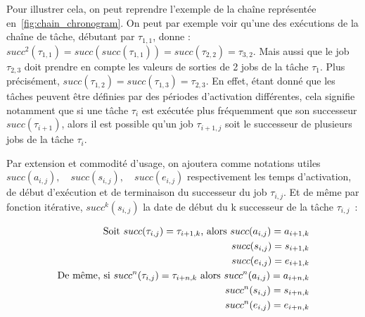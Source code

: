 \documentclass[french, a4paper, 11pt, twoside, pdftex]{StyleThese}
\begin{document}
		Pour illustrer cela, on peut reprendre l'exemple de la chaîne représentée en~\autoref{fig:chain_chronogram}. On peut par exemple voir qu'une des exécutions de la chaîne de tâche, débutant par $\tau_{1,1}$, donne : $succ^{2}(\tau_{1,1}) = succ(succ(\tau_{1,1})) = succ(\tau_{2,2}) = \tau_{3,2}$. Mais aussi que le job $ \tau_{2,3} $ doit prendre en compte les valeurs de sorties de 2 jobs de la tâche $ \tau_1 $. Plus précisément, $succ(\tau_{1,2}) = succ(\tau_{1,3}) = \tau_{2,3} $. %
		En effet, étant donné que les tâches peuvent être définies par des périodes d'activation différentes, cela signifie notamment que si une tâche $\tau_i$ est exécutée plus fréquemment que son successeur $succ(\tau_{i+1})$, alors il est possible  qu'un job $\tau_{i+1,j}$ soit le successeur de plusieurs jobs de la tâche $\tau_{i}$.
		
		Par extension et commodité d'usage, on ajoutera comme notations utiles $succ(a_{i,j}), \quad succ(s_{i,j}), \quad succ(e_{i,j})$ respectivement les temps d'activation, de début d'exécution et de terminaison du successeur du job $\tau_{i,j}$. Et de même par fonction itérative, $succ^k(s_{i,j})$ la date de début du k successeur de la tâche $\tau_{i,j}$~: 
		
		\begin{align*}
		\textup{Soit } succ(\tau_{i,j}) = \tau_{i+1,k} \textup{, alors }
			succ(a_{i,j}) = a_{i+1,k} 	\\
			succ(s_{i,j}) = s_{i+1,k}	\\
			succ(e_{i,j}) = e_{i+1,k}	\\
		\textup{De même, si } succ^n(\tau_{i,j}) = \tau_{i+n,k} \textup{ alors }
			succ^n(a_{i,j}) = a_{i+n,k}		\\
			succ^n(s_{i,j}) = s_{i+n,k}		\\
			succ^n(e_{i,j}) = e_{i+n,k}
		\end{align*}
	    
\end{document}
